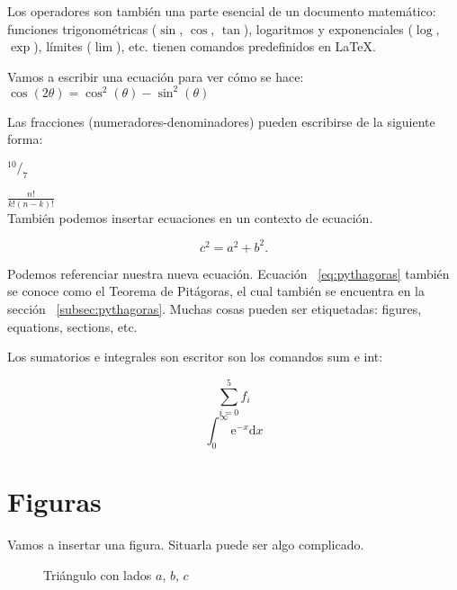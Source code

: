 \documentclass[12pt]{article}
\begin{document}
Los operadores son también una parte esencial de un documento matemático: 
funciones trigonométricas ($\sin$, $\cos$, $\tan$), logaritmos y exponenciales ($\log$, $\exp$), límites ($\lim$), etc. tienen comandos predefinidos en LaTeX.

Vamos a escribir una ecuación para ver cómo se hace: \\

$\cos(2\theta) = \cos^{2}(\theta) - \sin^{2}(\theta)$

Las fracciones (numeradores-denominadores) pueden escribirse de la siguiente forma:

$^{10}/_{7}$

$\frac{n!}{k!(n - k)!}$ \\

También podemos insertar ecuaciones en un contexto de ecuación.

\begin{equation} %
    c^2 = a^2 + b^2.
    \label{eq:pitagoras} %
\end{equation} %

Podemos referenciar nuestra nueva ecuación.
Ecuación ~\ref{eq:pythagoras} también se conoce como el Teorema de Pitágoras, el cual también se encuentra en la sección ~\ref{subsec:pythagoras}. Muchas cosas pueden ser etiquetadas: figures, equations, sections, etc.

Los sumatorios e integrales son escritor son los comandos sum e int:

\begin{equation}
  \sum_{i=0}^{5} f_{i}
\end{equation}
\begin{equation}
  \int_{0}^{\infty} \mathrm{e}^{-x} \mathrm{d}x
\end{equation}

\section{Figuras}

Vamos a insertar una figura. Situarla puede ser algo complicado.

\begin{figure}[H] %
    \centering %
    \caption{Triángulo con lados $a$, $b$, $c$}
    \label{fig:right-triangle}
\end{figure}
\end{document}
